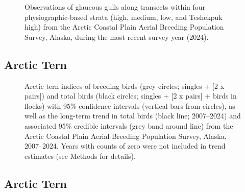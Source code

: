 \documentclass[
]{article}
\begin{document}
\begin{figure}


\caption{\label{fig-GLGUmap}Observations of glaucous gulls along
transects within four physiographic-based strata (high, medium, low, and
Teshekpuk high) from the Arctic Coastal Plain Aerial Breeding Population
Survey, Alaska, during the most recent survey year (2024).}

\end{figure}%

\newpage{}

\subsection*{Arctic Tern}\label{arctic-tern}

\begin{figure}


\caption{\label{fig-ARTE}Arctic tern indices of breeding birds (grey
circles; singles + {[}2 x pairs{]}) and total birds (black circles;
singles + {[}2 x pairs{]} + birds in flocks) with 95\% confidence
intervals (vertical bars from circles), as well as the long-term trend
in total birds (black line; 2007--2024) and associated 95\% credible
intervals (grey band around line) from the Arctic Coastal Plain Aerial
Breeding Population Survey, Alaska, 2007--2024. Years with counts of
zero were not included in trend estimates (see Methods for details).}

\end{figure}%

\newpage{}

\subsection*{Arctic Tern}\label{arctic-tern-1}

\begingroup\fontsize{10}{12}\selectfont
\end{document}

